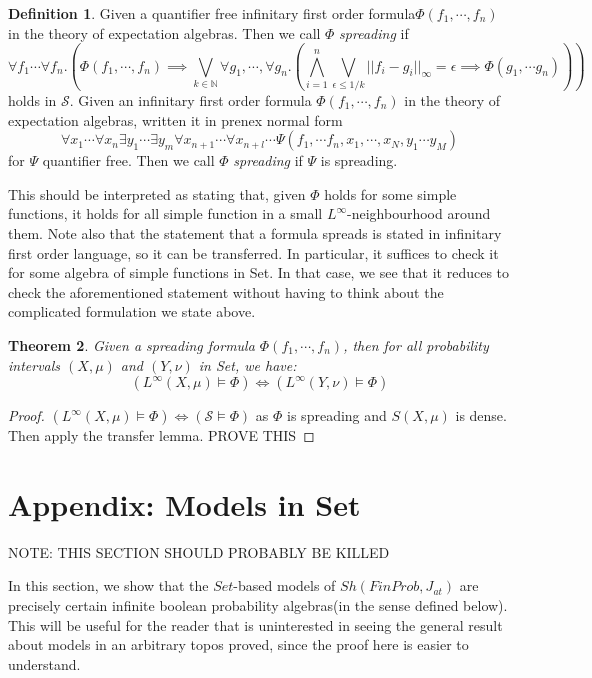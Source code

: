 \documentclass[a4paper]{amsproc}
\theoremstyle{plain}
\newtheorem{theorem}{Theorem}[section]
\theoremstyle{definition}
\newtheorem{definition}[theorem]{Definition}
\theoremstyle{remark}
\numberwithin{equation}{section}
\begin{document}
\begin{definition} Given a quantifier free infinitary first order formula\linebreak $\Phi(f_1,\cdots, f_n)$ in the theory of expectation algebras. Then we call $\Phi$ \emph{spreading} if 
\[\forall f_1\cdots \forall f_n.( \Phi(f_1,\cdots, f_n)\implies \bigvee_{k\in \mathbb{N}}\forall g_1,\cdots, \forall g_n.(\bigwedge_{i=1}^n\bigvee_{\epsilon\leq 1/k}||f_i-g_i||_{\infty}=\epsilon\implies \Phi(g_1,\cdots g_n))) \]
holds in $\mathcal{S}$.\newline
\indent  Given an infinitary first order formula $\Phi(f_1,\cdots, f_n)$ in the theory of expectation algebras, written it in prenex normal form
\[\forall x_1\cdots \forall x_n \exists y_1\cdots \exists y_m \forall x_{n+1}\cdots \forall x_{n+l}\cdots \Psi(f_1,\cdots f_n, x_1,\cdots, x_N, y_1\cdots y_M) \]
for $\Psi$ quantifier free. Then we call $\Phi$ \emph{spreading} if $\Psi$ is spreading.
\end{definition}
This should be interpreted as stating that, given $\Phi$ holds for some simple functions, it holds for all simple function in a small $L^\infty$-neighbourhood around them. Note also that the statement that a formula spreads is stated in infinitary first order language, so it can be transferred. In particular, it suffices to check it for some algebra of simple functions in Set. In that case, we see that it reduces to check the aforementioned statement without having to think about the complicated formulation we state above.
\begin{theorem}
Given a spreading formula $\Phi(f_1,\cdots,f_n)$, then for all probability intervals $(X,\mu)$ and $(Y,\nu)$ in Set, we have:
\[(L^\infty(X,\mu)\vDash \Phi)\iff(L^\infty(Y,\nu)\vDash\Phi)  \] 
\end{theorem}
\begin{proof}
$(L^\infty(X,\mu)\vDash \Phi)\iff (\mathcal{S}\vDash \Phi)$ as $\Phi$ is spreading and $S(X,\mu)$ is dense. Then apply the transfer lemma. PROVE THIS
\end{proof}


\section{Appendix: Models in Set}

NOTE: THIS SECTION SHOULD PROBABLY BE KILLED

In this section, we show that the $Set$-based models of $Sh(FinProb, J_{at})$ are precisely certain infinite boolean probability algebras(in the sense defined below). This will be useful for the reader that is uninterested in seeing the general result about models in an arbitrary topos proved, since the proof here is easier to understand.
\end{document}
